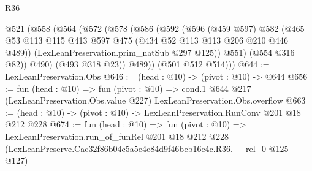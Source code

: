 \begin{lexlean}{R36}
\begin{coremodule}
      @521
        (@558
          (@564
            (@572
              (@578
                (@586
                  (@592
                    (@596
                      (@459 @597)
                      @582
                      (@465 @53 @113 @115 @413 @597 @475 (@434 @52 @113 @113 @206 @210 @446 @489))
                      (LexLeanPreservation.prim_natSub @297 @125))
                    @551)
                  (@554 @316 @82))
                @490)
              (@493 @318 @23))
            @489))
        (@501 @512 @514)))
@644 := LexLeanPreservation.Obs
@646 := (head : @10) -> (pivot : @10) -> @644
@656 := fun (head : @10) =>
  fun (pivot : @10) =>
  cond.{1} @644 @217 (LexLeanPreservation.Obs.value @227) LexLeanPreservation.Obs.overflow
@663 := (head : @10) -> (pivot : @10) -> LexLeanPreservation.RunConv @201 @18 @212 @228
@674 := fun (head : @10) =>
  fun (pivot : @10) =>
  LexLeanPreservation.run_of_funRel
    @201
    @18
    @212
    @228
    (LexLeanPreserve.Cac32f86b04c5a5e4c84d9f46beb16e4c.R36.__rel_0 @125 @127)
\end{coremodule}
\end{lexlean}

